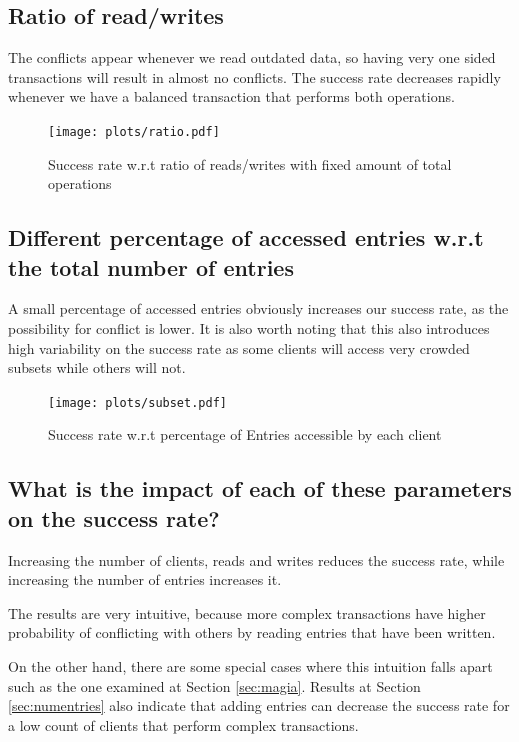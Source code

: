 \documentclass[a4paper, 10pt]{article}
\begin{document}
\clearpage
\subsection{Ratio of read/writes}
\label{sec:ratioreadwrites}

The conflicts appear whenever we read outdated data, so having very one sided transactions will result in almost no conflicts. The success rate decreases rapidly whenever we have a balanced transaction that performs both operations.

\begin{figure}[H]
  \centering
  \texttt{[image: plots/ratio.pdf]}
    \caption{Success rate w.r.t ratio of reads/writes with fixed amount of total operations}
    \label{fig:ratio}
\end{figure} 

\subsection{Different percentage of accessed entries w.r.t the total number of entries}
\label{sec:nose}
A small percentage of accessed entries obviously increases our success rate, as the possibility for conflict is lower. It is also worth noting that this also introduces high variability on the success rate as some clients will access very crowded subsets while others will not.
\begin{figure}[H]
  \centering
  \texttt{[image: plots/subset.pdf]}
    \caption{Success rate w.r.t percentage of Entries accessible by each client}
    \label{fig:subset}
\end{figure} 


\subsection{What is the impact of each of these parameters on the success rate?}
Increasing the number of clients, reads and writes reduces the success rate, while increasing the number of entries increases it.

The results are very intuitive, because more complex transactions have higher probability of conflicting with others by reading entries that have been written.


On the other hand, there are some special cases where this intuition falls apart such as the one examined at Section \ref{sec:magia}. Results at Section \ref{sec:numentries} also indicate that adding entries can decrease the success rate for a low count of clients that perform complex transactions.
\end{document}
